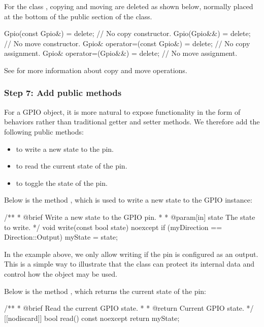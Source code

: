 For the class , copying and moving are deleted as shown below, normally placed at the
bottom of the public section of the class.

\begin{cppcode}
Gpio(const Gpio&)            = delete; // No copy constructor.
Gpio(Gpio&&)                 = delete; // No move constructor.
Gpio& operator=(const Gpio&) = delete; // No copy assignment.
Gpio& operator=(Gpio&&)      = delete; // No move assignment.
\end{cppcode}

\noindent See  for more information about copy and move operations.

\subsubsection{Step 7: Add public methods}
For a GPIO object, it is more natural to expose functionality in the form of behaviors rather than
traditional getter and setter methods. We therefore add the following public methods:
\begin{itemize}
  \item {} to write a new state to the pin.
  \item {} to read the current state of the pin.
  \item {} to toggle the state of the pin.
\end{itemize}
Below is the method , which is used to write a new state to the GPIO instance:

\begin{cppcode}
/**
 * @brief Write a new state to the GPIO pin.
 *
 * @param[in] state The state to write.
 */
void write(const bool state) noexcept
{
    if (myDirection == Direction::Output)
    {
        myState = state;
    }
}
\end{cppcode}

\noindent In the example above, we only allow writing if the pin is configured as an output. This is
a simple way to illustrate that the class can protect its internal data and control how the object
may be used.

Below is the method , which returns the current state of the pin:

\begin{cppcode}
/**
 * @brief Read the current GPIO state.
 *
 * @return Current GPIO state.
 */
[[nodiscard]] bool read() const noexcept { return myState; }
\end{cppcode}

